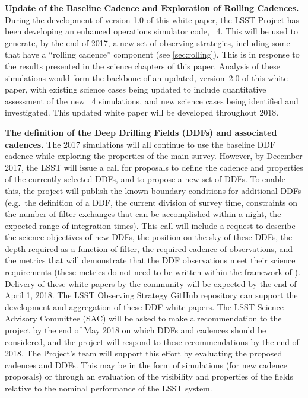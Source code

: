 \begin{description}

\item{\textbf{Update of the Baseline Cadence and Exploration of Rolling
Cadences.}} During the development of version 1.0 of this white paper, the LSST
Project has been developing an enhanced operations simulator code,
\OpSim~4. This will be used to generate, by the end of 2017, a new set of
observing strategies, including some that have a ``rolling cadence''
component (see \autoref{sec:rolling}). This is in response to the results presented in the science
chapters of this paper. Analysis of these simulations would form the
backbone of an updated, version~2.0 of this white paper, with existing
science cases being updated to include quantitative assessment of the
new \OpSim~4 simulations, and new science cases being identified and
investigated. This updated white paper will be developed throughout 2018.

\item{\textbf{The definition of the Deep Drilling Fields (DDFs) and
associated cadences.}} The 2017 simulations will all continue
to use the baseline DDF cadence while exploring the properties of the main survey. However, by December 2017, the LSST
will issue a call for proposals to define the cadence and properties of
the currently selected DDFs, and to propose a new set of DDFs. To enable
this, the project will publish the known boundary conditions for
additional DDFs (e.g.\ the definition of a DDF, the current division of
survey time, constraints on the number of filter exchanges that can be
accomplished within a night, the expected range of integration times).
This call will include a request to describe the science objectives of
new DDFs, the position on the sky of these DDFs, the depth required as a
function of filter, the required cadence of observations, and the
metrics that will demonstrate that the DDF observations meet their
science requirements (these metrics do not need to be written within the
framework of \MAF). Delivery of these white papers by the community will
be expected by the end of April 1, 2018.  The LSST Observing Strategy GitHub
repository can support the development and aggregation of these DDF
white papers. The LSST Science Advisory Committee (SAC) will be asked to make a recommendation to the
project by the end of May 2018 on which DDFs and cadences should be
considered, and the project will respond to these recommendations by
the end of 2018. The Project's \OpSim team will support
this effort by evaluating the proposed cadences and DDFs. This may be in
the form of simulations (for new cadence proposals) or through an
evaluation of the visibility and properties of the fields relative to
the nominal performance of the LSST system.


\end{description}
